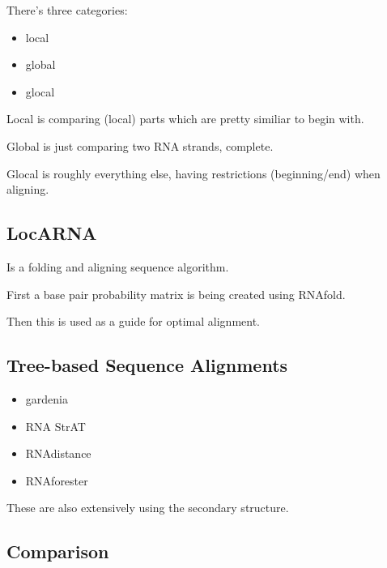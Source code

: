 \documentclass{scrartcl}
\begin{document}
There's three categories:
\begin{itemize}
\item local
\item global
\item glocal
\end{itemize}

Local is comparing (local) parts which are pretty similiar to begin with.

Global is just comparing two RNA strands, complete.

Glocal is roughly everything else, having restrictions (beginning/end) when aligning.


\subsection*{LocARNA}

Is a folding and aligning sequence algorithm.

First a base pair probability matrix is being created using RNAfold.

Then this is used as a guide for optimal alignment.


\subsection*{Tree-based Sequence Alignments}

\begin{itemize}
\item gardenia
\item RNA StrAT
\item RNAdistance
\item RNAforester
\end{itemize}

These are also extensively using the secondary structure.


\subsection*{Comparison}
\end{document}
